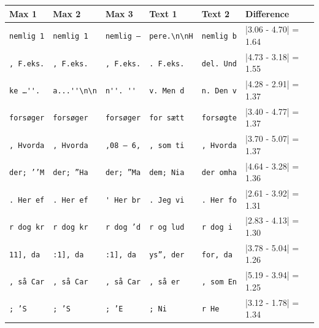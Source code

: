 \begin{table}
    \begin{tabular}{lll|lll}
        \textbf{Max 1}    & \textbf{Max 2}    & \textbf{Max 3}       &
        \textbf{Text 1}   & \textbf{Text 2}   & \textbf{Difference}  \\
        \hline
        \verb[nemlig 1[   & \verb[nemlig 1[   & \verb[nemlig –[      &
        \verb'pere.\n\nH' & \verb'nemlig b'   & |3.06 - 4.70| = 1.64 \\

        \verb[, F.eks.[   & \verb[, F.eks.[   & \verb[, F.eks.[      &
        \verb'. F.eks.'   & \verb'del. Und'   & |4.73 - 3.18| = 1.55 \\

        \verb[ke …''. [   & \verb[a...''\n\n[ & \verb[n''. '' [      &
        \verb'v. Men d'   & \verb'n. Den v'   & |4.28 - 2.91| = 1.37 \\

        \verb[forsøger[   & \verb[forsøger[   & \verb[forsøger[      &
        \verb'for sætt'   & \verb'forsøgte'   & |3.40 - 4.77| = 1.37 \\

        \verb[, Hvorda[   & \verb[, Hvorda[   & \verb[,08 – 6,[      &
        \verb', som ti'   & \verb', Hvorda'   & |3.70 - 5.07| = 1.37 \\

        \verb[der; ’’M[   & \verb[der; ”Ha[   & \verb[der; ”Ma[      &
        \verb'dem; Nia'   & \verb'der omha'   & |4.64 - 3.28| = 1.36 \\

        \verb[. Her ef[   & \verb[. Her ef[   & \verb[' Her br[      &
        \verb'. Jeg vi'   & \verb'. Her fo'   & |2.61 - 3.92| = 1.31 \\

        \verb[r dog kr[   & \verb[r dog kr[   & \verb[r dog ’d[      &
        \verb'r og lud'   & \verb'r dog i '   & |2.83 - 4.13| = 1.30 \\

        \verb[11], da [   & \verb[:1], da [   & \verb[:1], da [      &
        \verb'ys”, der'   & \verb'for, da '   & |3.78 - 5.04| = 1.26 \\

        \verb[, så Car[   & \verb[, så Car[   & \verb[, så Car[      &
        \verb', så er '   & \verb', som En'   & |5.19 - 3.94| = 1.25 \\
        \hline
        \verb[; ’S[       & \verb[; ’S[       & \verb[; ’E[          &
        \verb'; Ni'       & \verb'r He'       & |3.12 - 1.78| = 1.34 \\


\end{tabular}
\end{table}
